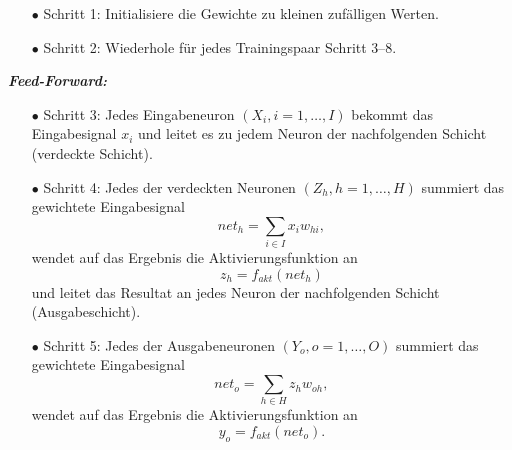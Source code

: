 \begin{itemize}
\item[\textbf{$\bullet$}] Schritt 1: Initialisiere die Gewichte zu kleinen zufälligen Werten.
\item[\textbf{$\bullet$}] Schritt 2: Wiederhole für jedes Trainingspaar Schritt 3--8.
\end{itemize}

\textbf{\textit{Feed-Forward:}}
\begin{itemize}
\item[\textbf{$\bullet$}] Schritt 3: Jedes Eingabeneuron $(X_{i}, i=1,\dots,I)$ bekommt das Eingabesignal $x_{i}$ und leitet es zu jedem Neuron der nachfolgenden Schicht (verdeckte Schicht).

\item[\textbf{$\bullet$}] Schritt 4: Jedes der verdeckten Neuronen $(Z_{h}, h=1,\dots,H)$ summiert das gewichtete Eingabesignal
\begin{equation}
net_{h}=\sum\limits_{i \in I} x_{i}w_{hi},
\end{equation}
wendet auf das Ergebnis die Aktivierungsfunktion an 
\begin{equation}
z_{h}=f_{akt}(net_{h})
\end{equation}
und leitet das Resultat an jedes Neuron der nachfolgenden Schicht (Ausgabeschicht).

\item[\textbf{$\bullet$}] Schritt 5: Jedes der Ausgabeneuronen $(Y_{o}, o=1,\dots,O)$ summiert das gewichtete Eingabesignal 
\begin{equation}
net_{o}=\sum\limits_{h \in H} z_{h}w_{oh},
\end{equation}
wendet auf das Ergebnis die Aktivierungsfunktion an 
\begin{equation}
y_{o}=f_{akt}(net_{o}).
\end{equation}
\end{itemize}

